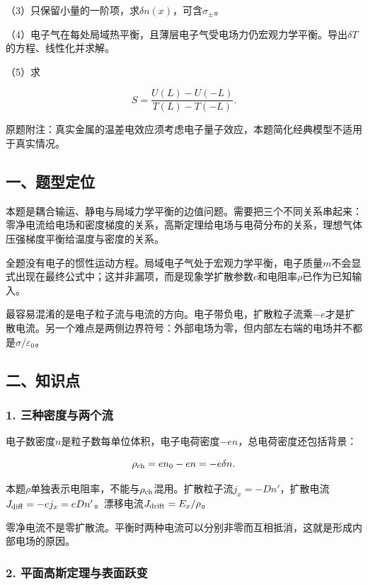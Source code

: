 \documentclass[12pt,a4paper,fontset=fandol]{ctexart}
\begin{document}
（3）只保留小量的一阶项，求\(\delta n(x)\)，可含\(\sigma_\pm\)。

（4）电子气在每处局域热平衡，且薄层电子气受电场力仍宏观力学平衡。导出\(\delta T\)的方程、线性化并求解。

（5）求

\[
S=\frac{U(L)-U(-L)}{T(L)-T(-L)}.
\]

原题附注：真实金属的温差电效应须考虑电子量子效应，本题简化经典模型不适用于真实情况。

\subsection{一、题型定位}\label{ux4e00ux9898ux578bux5b9aux4f4d-5}

本题是耦合输运、静电与局域力学平衡的边值问题。需要把三个不同关系串起来：零净电流给电场和密度梯度的关系，高斯定理给电场与电荷分布的关系，理想气体压强梯度平衡给温度与密度的关系。

全题没有电子的惯性运动方程。局域电子气处于宏观力学平衡，电子质量\(m\)不会显式出现在最终公式中；这并非漏项，而是现象学扩散参数\(c\)和电阻率\(\rho\)已作为已知输入。

最容易混淆的是电子粒子流与电流的方向。电子带负电，扩散粒子流乘\(-e\)才是扩散电流。另一个难点是两侧边界符号：外部电场为零，但内部左右端的电场并不都是\(\sigma/\varepsilon_0\)。

\subsection{二、知识点}\label{ux4e8cux77e5ux8bc6ux70b9-5}

\subsubsection{1.
三种密度与两个流}\label{ux4e09ux79cdux5bc6ux5ea6ux4e0eux4e24ux4e2aux6d41}

电子数密度\(n\)是粒子数每单位体积，电子电荷密度\(-en\)，总电荷密度还包括背景：

\[
\rho_{\rm ch}=en_0-en=-e\delta n.
\]

本题\(\rho\)单独表示电阻率，不能与\(\rho_{\rm ch}\)混用。扩散粒子流\(j_x=-Dn'\)，扩散电流\(J_{\rm diff}=-ej_x=eDn'\)。漂移电流\(J_{\rm drift}=E_x/\rho\)。

零净电流不是零扩散流。平衡时两种电流可以分别非零而互相抵消，这就是形成内部电场的原因。

\subsubsection{2.
平面高斯定理与表面跃变}\label{ux5e73ux9762ux9ad8ux65afux5b9aux7406ux4e0eux8868ux9762ux8dc3ux53d8}
\end{document}
